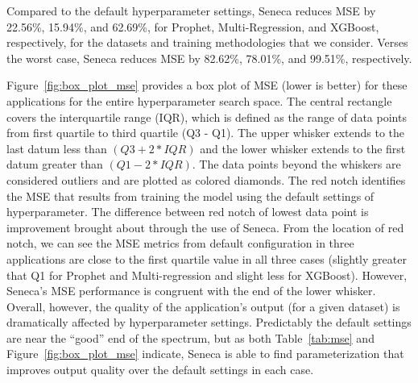 %

Compared to the default hyperparameter settings,
Seneca reduces MSE by 22.56\%, 15.94\%, and 62.69\%, for Prophet, Multi-Regression, and XGBoost, respectively, for the datasets and training methodologies that we consider.
Verses the worst case, Seneca reduces MSE by 82.62\%, 78.01\%, and 99.51\%, respectively.

Figure~\ref{fig:box_plot_mse} provides a box plot of MSE (lower is better) for
these applications for the entire hyperparameter search space. The central
rectangle covers the interquartile range (IQR), which is defined as the range
of data points from first quartile to third quartile (Q3 - Q1).  The upper
whisker extends to the last datum less than \texttt{$(Q3 + 2 * IQR)$} and the
lower whisker extends to the first datum greater than \texttt{$(Q1 - 2 *
IQR)$}. The data points beyond the whiskers are considered outliers and are
plotted as colored diamonds. The red notch identifies the MSE that results
from training the model using the default settings of hyperparameter. The
difference between red notch of lowest data point is improvement brought about
through the use of Seneca. From the location of red notch, we can see the MSE
metrics from default configuration in three applications are close to the
first quartile value in all three cases (slightly greater that Q1 for Prophet
and Multi-regression and slight less for XGBoost). However, Seneca's MSE
performance is congruent with the end of the lower whisker.  Overall, however,
the quality of the application's output (for a given dataset) is dramatically
affected by hyperparameter settings.  Predictably the default settings are
near the ``good'' end of the spectrum, but as both Table~\ref{tab:mse} and
Figure~\ref{fig:box_plot_mse} indicate, Seneca is able to find
parameterization that improves output quality over the default settings
in each case.


